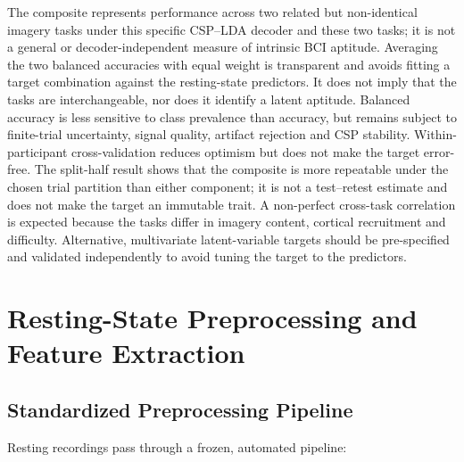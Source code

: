 \documentclass{ieeeaccess}
\begin{document}
The composite represents performance across two related but non-identical imagery tasks under this specific CSP--LDA decoder and these two tasks; it is not a general or decoder-independent measure of intrinsic BCI aptitude. Averaging the two balanced accuracies with equal weight is transparent and avoids fitting a target combination against the resting-state predictors. It does not imply that the tasks are interchangeable, nor does it identify a latent aptitude. Balanced accuracy is less sensitive to class prevalence than accuracy, but remains subject to finite-trial uncertainty, signal quality, artifact rejection and CSP stability. Within-participant cross-validation reduces optimism but does not make the target error-free. The split-half result shows that the composite is more repeatable under the chosen trial partition than either component; it is not a test--retest estimate and does not make the target an immutable trait. A non-perfect cross-task correlation is expected because the tasks differ in imagery content, cortical recruitment and difficulty. Alternative, multivariate latent-variable targets should be pre-specified and validated independently to avoid tuning the target to the predictors.

\section{Resting-State Preprocessing and Feature Extraction}

\subsection{Standardized Preprocessing Pipeline}

Resting recordings pass through a frozen, automated pipeline:
\end{document}
